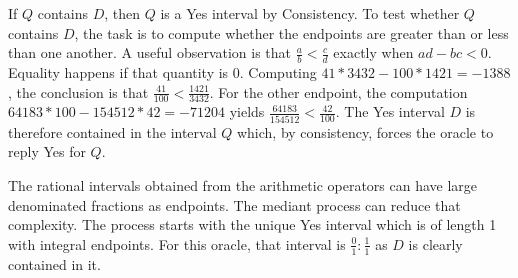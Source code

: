 \documentclass[12pt]{article}
\begin{document}
If $Q$ contains $D$, then $Q$ is a Yes interval by Consistency. To test whether $Q$ contains $D$, the task is to compute whether the endpoints are greater than or less than one another. A useful observation is that $\frac{a}{b} < \frac{c}{d}$ exactly when $ad - bc < 0$. Equality happens if that quantity is 0. Computing $41*3432 - 100*1421 = -1388$, the conclusion is that $\frac{41}{100} < \frac{1421}{3432}$. For the other endpoint, the computation $64183*100 - 154512*42 = -71204$ yields $ \frac{64183}{154512} < \frac{42}{100}$. The Yes interval $D$ is therefore contained in the interval $Q$ which, by consistency, forces the oracle to reply Yes for $Q$. 

The rational intervals obtained from the arithmetic operators can have large denominated fractions as endpoints. The mediant process can reduce that complexity. The process starts with the unique Yes interval which is of length 1 with integral endpoints. For this oracle, that interval is $\frac{0}{1}:\frac{1}{1}$ as $D$ is clearly contained in it. 
\end{document}
